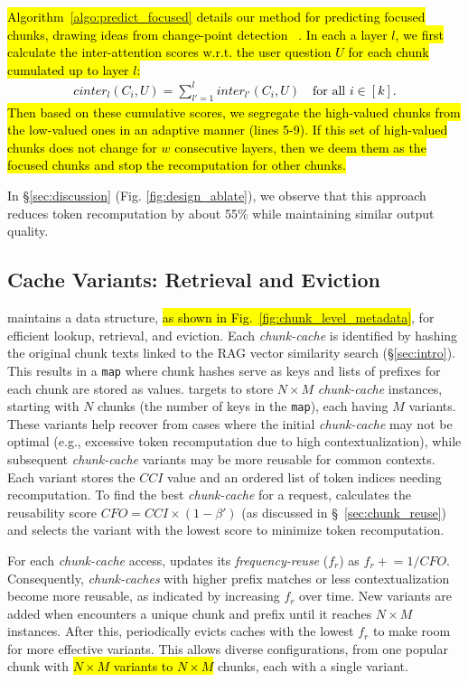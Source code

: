 \hl{
Algorithm~\ref{algo:predict_focused} details our method for predicting focused chunks, drawing ideas from change-point detection ~\cite{aminikhanghahi2018real}.
In each a layer $l$, we first calculate the inter-attention scores w.r.t. the user question $U$ for each chunk cumulated up to layer $l$: 
\begin{align}
    cinter_l(C_i, U) = \sum_{l'=1}^l inter_{l'}(C_{i}, U) \quad \text{for all } i \in [k].
\end{align}
Then based on these cumulative scores, we segregate the high-valued chunks from the low-valued ones in an adaptive manner (lines 5-9). If this set of high-valued chunks does not change for $w$ consecutive layers, then we deem them as the focused chunks and stop the recomputation for other chunks. }

In \S\ref{sec:discussion} (Fig. \ref{fig:design_ablate}), we observe that this approach reduces token recomputation by about 55\% while maintaining similar output quality.


\subsection{Cache Variants: Retrieval and Eviction}
\label{sec:variants}

\sys maintains a data structure, \hl{as shown in Fig.~\ref{fig:chunk_level_metadata}}, for efficient lookup, retrieval, and eviction. Each \textit{chunk-cache} is identified by hashing the original chunk texts linked to the RAG vector similarity search (\S\ref{sec:intro}). This results in a \texttt{map} where chunk hashes serve as keys and lists of prefixes for each chunk are stored as values. \sys targets to store $N \times M$ \textit{chunk-cache} instances, starting with $N$ chunks (the number of keys in the \texttt{map}), each having $M$ variants. These variants help \sys recover from cases where the initial  \textit{chunk-cache} may not be optimal (e.g., excessive token recomputation due to high contextualization), while subsequent \textit{chunk-cache} variants may be more reusable for common contexts. Each variant stores the $CCI$ value and an ordered list of token indices needing recomputation. To find the best \textit{chunk-cache} for a request, \sys calculates the reusability score \(CFO = CCI \times (1 - \beta')\) (as discussed in \S~\ref{sec:chunk_reuse}) and selects the variant with the lowest score to minimize token recomputation.

For each \textit{chunk-cache} access, \sys updates its \textit{frequency-reuse} ($f_r$) as \(f_r \mathrel{+}= 1/CFO\). Consequently, \textit{chunk-caches} with higher prefix matches or less contextualization become more reusable, as indicated by increasing \(f_r\) over time. New variants are added when \sys encounters a unique chunk and prefix until it reaches $N \times M$ instances. After this, \sys periodically evicts caches with the lowest \(f_r\) to make room for more effective variants. This allows diverse configurations, from one popular chunk with \hl{$N \times M$ variants to $N \times M$} chunks, each with a single variant.

